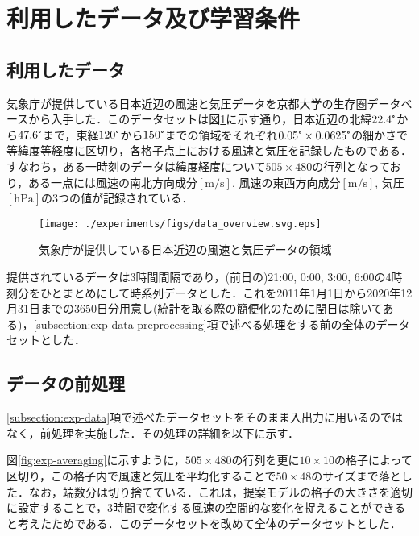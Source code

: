 \section{利用したデータ及び学習条件 \label{section:exp-data-and-condition}}
\subsection{利用したデータ \label{subsection:exp-data}}
気象庁が提供している日本近辺の風速と気圧データを京都大学の生存圏データベース\cite{Seizonken2004}から入手した．このデータセットは図\ref{fig:exp-data-overview}に示す通り，日本近辺の北緯$22.4\tcdegree$から$47.6\tcdegree$まで，東経$120\tcdegree$から$150\tcdegree$までの領域をそれぞれ$0.05\tcdegree \times 0.0625\tcdegree$の細かさで等緯度等経度に区切り，各格子点上における風速と気圧を記録したものである\cite{JMBSC2022}．すなわち，ある一時刻のデータは緯度経度について$505 \times 480$の行列となっており，ある一点には風速の南北方向成分$[\mathrm{m/s}]$, 風速の東西方向成分$[\mathrm{m/s}]$, 気圧$[\mathrm{hPa}]$の3つの値が記録されている．
\begin{figure}[bp]
  \centering
  \texttt{[image: ./experiments/figs/data\_overview.svg.eps]}
  \caption{気象庁が提供している日本近辺の風速と気圧データの領域}
  \label{fig:exp-data-overview}
\end{figure}

提供されているデータは3時間間隔であり，(前日の)21:00, 0:00, 3:00, 6:00の4時刻分をひとまとめにして時系列データとした．これを2011年1月1日から2020年12月31日までの3650日分用意し(統計を取る際の簡便化のために閏日は除いてある)，\ref{subsection:exp-data-preprocessing}項で述べる処理をする前の全体のデータセットとした．


\subsection{データの前処理 \label{subsection:exp-data-preprocessing}}
\ref{subsection:exp-data}項で述べたデータセットをそのまま入出力に用いるのではなく，前処理を実施した．その処理の詳細を以下に示す．

図\ref{fig:exp-averaging}に示すように，$505 \times 480$の行列を更に$10 \times 10$の格子によって区切り，この格子内で風速と気圧を平均化することで$50 \times 48$のサイズまで落とした．なお，端数分は切り捨てている．これは，提案モデルの格子の大きさを適切に設定することで，3時間で変化する風速の空間的な変化を捉えることができると考えたためである．このデータセットを改めて全体のデータセットとした．%

